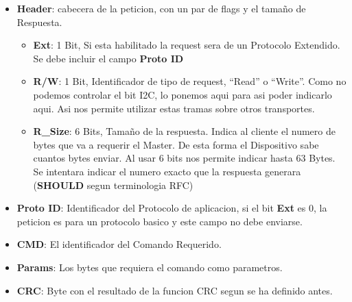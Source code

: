 \begin{itemize}
    \item{} \textbf{Header}: cabecera de la peticion, con un par de flags y el tamaño de Respuesta.
          \begin{itemize}
              \item{} \textbf{Ext}: 1 Bit, Si esta habilitado la request sera de un Protocolo Extendido. Se debe
                    incluir el campo \textbf{Proto ID}
              \item{} \textbf{R/W}: 1 Bit, Identificador de tipo de request, ``Read'' o ``Write''. Como no podemos
                    controlar el bit I2C, lo ponemos aqui para asi poder indicarlo aqui. Asi nos permite utilizar estas tramas
                    sobre otros transportes.
              \item{} \textbf{R\_Size}: 6 Bits, Tamaño de la respuesta. Indica al cliente el numero de bytes que va a requerir el
                    Master. De esta forma el Dispositivo sabe cuantos bytes enviar. Al usar 6 bits nos permite indicar hasta 63 Bytes.
                    Se intentara indicar el numero exacto que la respuesta generara (\textbf{SHOULD} segun terminologia RFC)
          \end{itemize}
    \item{} \textbf{Proto ID}: Identificador del Protocolo de aplicacion, si el bit \textbf{Ext} es 0, la peticion
          es para un protocolo basico y este campo no debe enviarse.
    \item{} \textbf{CMD}: El identificador del Comando Requerido.
    \item{} \textbf{Params}: Los bytes que requiera el comando como parametros.
    \item{} \textbf{CRC}: Byte con el resultado de la funcion CRC segun se ha definido antes.
\end{itemize}

